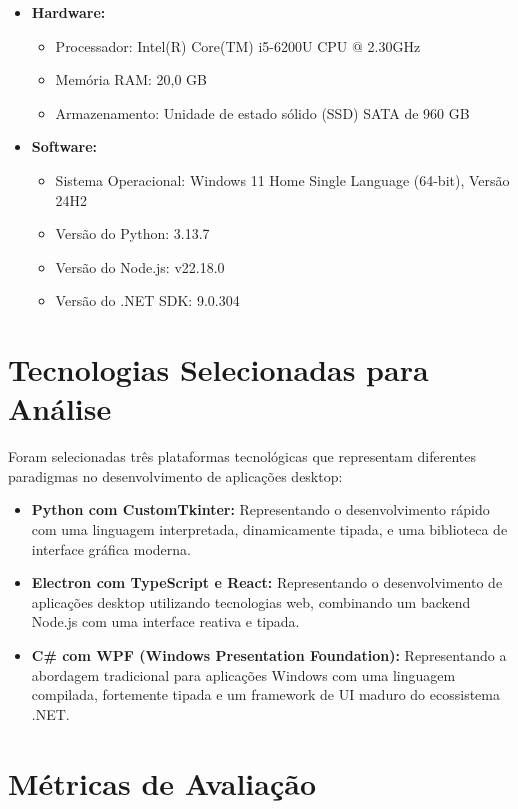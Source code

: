 \begin{itemize}
	\item \textbf{Hardware:}
	\begin{itemize}
		\item Processador: Intel(R) Core(TM) i5-6200U CPU @ 2.30GHz
		\item Memória RAM: 20,0 GB
		\item Armazenamento: Unidade de estado sólido (SSD) SATA de 960 GB
	\end{itemize}
	\vspace{0.2cm} %
	\item \textbf{Software:}
	\begin{itemize}
		\item Sistema Operacional: Windows 11 Home Single Language (64-bit), Versão 24H2
		\item Versão do Python: 3.13.7
		\item Versão do Node.js: v22.18.0
		\item Versão do .NET SDK: 9.0.304
	\end{itemize}
\end{itemize}

\section{Tecnologias Selecionadas para Análise}
\label{sec:tecnologias_selecionadas}

Foram selecionadas três plataformas tecnológicas que representam diferentes paradigmas no desenvolvimento de aplicações desktop:

\begin{itemize}
	\item \textbf{Python com CustomTkinter:} Representando o desenvolvimento rápido com uma linguagem interpretada, dinamicamente tipada, e uma biblioteca de interface gráfica moderna.
	\item \textbf{Electron com TypeScript e React:} Representando o desenvolvimento de aplicações desktop utilizando tecnologias web, combinando um backend Node.js com uma interface reativa e tipada.
	\item \textbf{C\# com WPF (Windows Presentation Foundation):} Representando a abordagem tradicional para aplicações Windows com uma linguagem compilada, fortemente tipada e um framework de UI maduro do ecossistema .NET.
\end{itemize}


\section{Métricas de Avaliação}
\label{sec:metricas}

